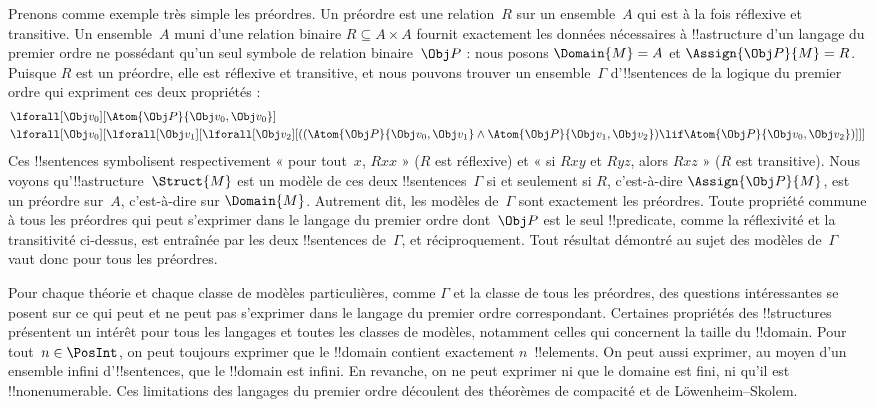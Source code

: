 \documentclass[11pt,a4paper,openany]{memoir}
\begin{document}
Prenons comme exemple très simple les préordres. Un préordre est une
relation~$R$ sur un ensemble~$A$ qui est à la fois réflexive et
transitive. Un ensemble~$A$ muni d'une relation binaire
$R \subseteq A \times A$ fournit exactement les données nécessaires à
!!a{structure} d'un langage du premier ordre ne possédant qu'un seul
symbole de relation binaire~$\Obj P$ : nous posons
$\Domain{M} = A$ et $\Assign{\Obj P}{M} = R$. Puisque $R$ est un
préordre, elle est réflexive et transitive, et nous pouvons trouver un
ensemble~$\Gamma$ d'!!{sentence}s de la logique du premier ordre qui
expriment ces deux propriétés :
\begin{align*}
  & \lforall[\Obj v_0][\Atom{\Obj P}{\Obj v_0,\Obj v_0}]\\
  & \lforall[\Obj v_0][\lforall[\Obj v_1][\lforall[\Obj v_2]
    [((\Atom{\Obj P}{\Obj v_0,\Obj v_1} \land
       \Atom{\Obj P}{\Obj v_1,\Obj v_2})
      \lif \Atom{\Obj P}{\Obj v_0,\Obj v_2})]]]
\end{align*}
Ces !!{sentence}s symbolisent respectivement « pour tout~$x$, $Rxx$ »
($R$ est réflexive) et « si $Rxy$ et $Ryz$, alors $Rxz$ » ($R$ est
transitive). Nous voyons qu'!!a{structure}~$\Struct{M}$ est un modèle
de ces deux !!{sentence}s~$\Gamma$ si et seulement si $R$, c'est-à-dire
$\Assign{\Obj P}{M}$, est un préordre sur~$A$, c'est-à-dire sur
$\Domain{M}$. Autrement dit, les modèles de~$\Gamma$ sont exactement
les préordres. Toute propriété commune à tous les préordres qui peut
s'exprimer dans le langage du premier ordre dont~$\Obj P$ est le seul
!!{predicate}, comme la réflexivité et la transitivité ci-dessus, est
entraînée par les deux !!{sentence}s de~$\Gamma$, et réciproquement.
Tout résultat démontré au sujet des modèles de~$\Gamma$ vaut donc pour
tous les préordres.

Pour chaque théorie et chaque classe de modèles particulières, comme
$\Gamma$ et la classe de tous les préordres, des questions intéressantes
se posent sur ce qui peut et ne peut pas s'exprimer dans le langage du
premier ordre correspondant. Certaines propriétés des !!{structure}s
présentent un intérêt pour tous les langages et toutes les classes de
modèles, notamment celles qui concernent la taille du !!{domain}. Pour
tout~$n \in \PosInt$, on peut toujours exprimer que le !!{domain}
contient exactement $n$~!!{element}s. On peut aussi exprimer, au moyen
d'un ensemble infini d'!!{sentence}s, que le !!{domain} est infini. En
revanche, on ne peut exprimer ni que le domaine est fini, ni qu'il est
!!{nonenumerable}. Ces limitations des langages du premier ordre
découlent des théorèmes de compacité et de L\"owenheim--Skolem.
\end{document}
